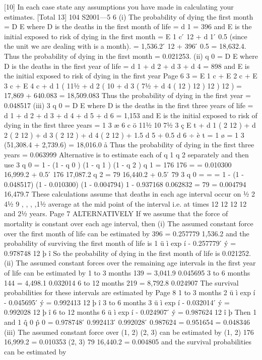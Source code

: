 \documentclass[a4paper,1pt]{article}
\begin{document}
[10]
In each case state any assumptions you have made in calculating your estimates.
[Total 13]
104 S2001—5
6
(i)
The probability of dying the first month
=
D
E
where D is the deaths in the first month of life = d 1 = 396
and E is the initial exposed to risk of dying in the first month
= E 1 c  ́ 12 + d 1  ́ 0.5 (since the unit we are dealing with is a month).
= 1,536.2  ́ 12 + 396  ́ 0.5 = 18,632.4.
Thus the probability of dying in the first month = 0.021253.
(ii)
q 0 =
D
E
where D is the deaths in the first year of life = d 1 + d 2 + d 3 + d 4 = 898
and E is the initial exposed to risk of dying in the first year
Page 6 %
3
= E 1 c + E 2 c + E 3 c + E 4 c + d 1 ( 111⁄2
+ d 2 ( 10
+ d 3 ( 71⁄2
+ d 4 ( 12
)
12 )
12 )
12 )
= 17,869 + 640.083 = 18,509.083
Thus the probability of dying in the first year = 0.048517
(iii)
3 q 0
=
D
E
where D is the deaths in the first three years of life
= d 1 + d 2 + d 3 + d 4 + d 5 + d 6 = 1,153
and E is the initial exposed to risk of dying in the first three years
= 1
3 æ 6 c
ö
111⁄2
10
71⁄2
3
ç E t + d 1 ( 2 12 ) + d 2 ( 2 12 ) + d 3 ( 2 12 ) + d 4 ( 2 12 ) + 1.5 d 5 + 0.5 d 6 ÷
è t = 1
ø
= 1
3 (51,308.4 + 2,739.6) = 18,016.0
å
Thus the probability of dying in the first three years = 0.063999
Alternative is to estimate each of q 1 q 2 separately and then use
3 q 0 = 1 - (1 - q 0 ) (1 - q 1 ) (1 - q 2 )
q 1 = 176
176
=
= 0.010300
16,999.2 + 0.5  ́ 176
17,087.2
q 2 = 79
16,440.2 + 0.5  ́ 79
3 q 0 =
=
= 1 - (1 - 0.048517) (1 - 0.010300) (1 - 0.004794)
1 - 0.937168
0.062832
=
79
= 0.004794
16,479.7
These calculations assume that deaths in each age interval occur on
1⁄2 2 41⁄2 9
, ,
, ,11⁄2
average at the mid point of the interval i.e. at times
12 12 12 12
and 21⁄2 years.
Page 7 %
ALTERNATIVELY
If we assume that the force of mortality is constant over each age interval, then
(i)
The assumed constant force over the first month of life can be estimated
by
396
= 0.257779
1,536.2
and the probability of surviving the first month of life is
1 ü
ì
exp í - 0.257779  ́ ý = 0.978748
12 þ
î
So the probability of dying in the first month of life is 0.021252.
(ii)
The assumed constant forces over the remaining age intervals in the first
year of life can be estimated by
1 to 3 months 139
=
3,041.9 0.045695
3 to 6 months 144
=
4,498.1 0.032014
6 to 12 months 219
=
8,792.8 0.024907
The survival probabilities for these intervals are estimated by
Page 8
1 to 3 months 2 ü
ì
exp í - 0.045695  ́ ý = 0.992413
12 þ
î
3 to 6 months 3 ü
ì
exp í - 0.032014  ́ ý = 0.992028
12 þ
î
6 to 12 months 6 ü
ì
exp í - 0.024907  ́ ý = 0.987624
12
î
þ
Then 1
and 1 q̂ 0
p̂ 0 = 0.978748  ́ 0.992413  ́ 0.992028  ́ 0.987624
= 0.951654
= 0.048346 %
(iii)
The assumed constant force over (1, 2) (2, 3) can be estimated by
(1, 2) 176
16,999.2 = 0.010353
(2, 3) 79
16,440.2 = 0.004805
and the survival probabilities can be estimated by
\end{document}
